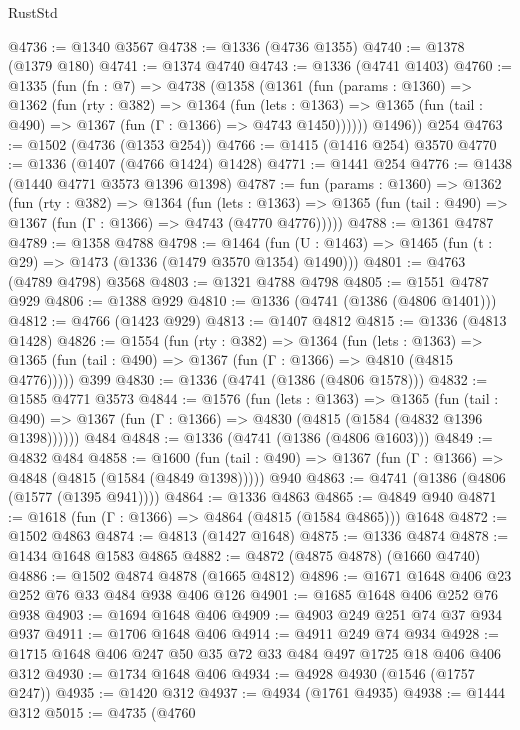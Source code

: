 \begin{lexlean}{RustStd}
\begin{coremodule}
{\begin{coremodule}
{{{{{{{{{{{{{{@4736 := @1340 @3567
@4738 := @1336 (@4736 @1355)
@4740 := @1378 (@1379 @180)
@4741 := @1374 @4740
@4743 := @1336 (@4741 @1403)
@4760 := @1335
    (fun (fn : @7) =>
    @4738
      (@1358
        (@1361
          (fun (params : @1360) =>
          @1362
            (fun (rty : @382) =>
            @1364
              (fun (lets : @1363) =>
              @1365 (fun (tail : @490) => @1367 (fun (Γ : @1366) => @4743 @1450))))))
        @1496))
    @254
@4763 := @1502 (@4736 (@1353 @254))
@4766 := @1415 (@1416 @254) @3570
@4770 := @1336 (@1407 (@4766 @1424) @1428)
@4771 := @1441 @254
@4776 := @1438 (@1440 @4771 @3573 @1396 @1398)
@4787 := fun (params : @1360) =>
  @1362
    (fun (rty : @382) =>
    @1364
      (fun (lets : @1363) =>
      @1365 (fun (tail : @490) => @1367 (fun (Γ : @1366) => @4743 (@4770 @4776)))))
@4788 := @1361 @4787
@4789 := @1358 @4788
@4798 := @1464 (fun (U : @1463) => @1465 (fun (t : @29) => @1473 (@1336 (@1479 @3570 @1354) @1490)))
@4801 := @4763 (@4789 @4798) @3568
@4803 := @1321 @4788 @4798
@4805 := @1551 @4787 @929
@4806 := @1388 @929
@4810 := @1336 (@4741 (@1386 (@4806 @1401)))
@4812 := @4766 (@1423 @929)
@4813 := @1407 @4812
@4815 := @1336 (@4813 @1428)
@4826 := @1554
    (fun (rty : @382) =>
    @1364
      (fun (lets : @1363) =>
      @1365 (fun (tail : @490) => @1367 (fun (Γ : @1366) => @4810 (@4815 @4776)))))
    @399
@4830 := @1336 (@4741 (@1386 (@4806 @1578)))
@4832 := @1585 @4771 @3573
@4844 := @1576
    (fun (lets : @1363) =>
    @1365
      (fun (tail : @490) => @1367 (fun (Γ : @1366) => @4830 (@4815 (@1584 (@4832 @1396 @1398))))))
    @484
@4848 := @1336 (@4741 (@1386 (@4806 @1603)))
@4849 := @4832 @484
@4858 := @1600
    (fun (tail : @490) => @1367 (fun (Γ : @1366) => @4848 (@4815 (@1584 (@4849 @1398)))))
    @940
@4863 := @4741 (@1386 (@4806 (@1577 (@1395 @941))))
@4864 := @1336 @4863
@4865 := @4849 @940
@4871 := @1618 (fun (Γ : @1366) => @4864 (@4815 (@1584 @4865))) @1648
@4872 := @1502 @4863
@4874 := @4813 (@1427 @1648)
@4875 := @1336 @4874
@4878 := @1434 @1648 @1583 @4865
@4882 := @4872 (@4875 @4878) (@1660 @4740)
@4886 := @1502 @4874 @4878 (@1665 @4812)
@4896 := @1671 @1648 @406 @23 @252 @76 @33 @484 @938 @406 @126
@4901 := @1685 @1648 @406 @252 @76 @938
@4903 := @1694 @1648 @406
@4909 := @4903 @249 @251 @74 @37 @934 @937
@4911 := @1706 @1648 @406
@4914 := @4911 @249 @74 @934
@4928 := @1715 @1648 @406 @247 @50 @35 @72 @33 @484 @497 @1725 @18 @406 @406 @312
@4930 := @1734 @1648 @406
@4934 := @4928 @4930 (@1546 (@1757 @247))
@4935 := @1420 @312
@4937 := @4934 (@1761 @4935)
@4938 := @1444 @312
@5015 := @4735
    (@4760
}}}}}}}}}}}}}}
\end{coremodule}}
\end{coremodule}
\end{lexlean}
